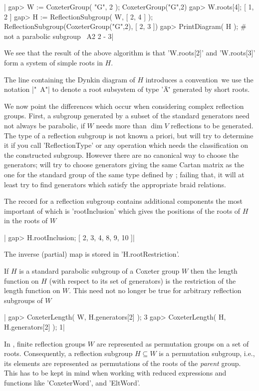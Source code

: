 |    gap> W := CoxeterGroup( "G", 2 );
    CoxeterGroup("G",2)
    gap> W.roots[4];
    [ 1, 2 ]
    gap> H := ReflectionSubgroup( W, [ 2, 4 ] );
    ReflectionSubgroup(CoxeterGroup("G",2), [ 2, 3 ])
    gap> PrintDiagram( H );         # not a parabolic subgroup
    ~A2 2 - 3|

We see that  the result of the above algorithm  is that 'W.roots[2]' and
'W.roots[3]' form a system of simple roots in $H$.

The line containing the Dynkin  diagram of $H$ introduces a convention\:\
we use the  notation |"~A"| to denote a  root  subsystem of type  '\"A\"'
generated by short roots.

We  now  point the  differences  which  occur when  considering  complex
reflection  groups. First,  a  subgroup  generated by  a  subset of  the
standard generators need not always be parabolic, if $W$ needs more than
$\dim V$ reflections to be generated.  The type of a reflection subgroup
is not  known a priori,  but {\CHEVIE} will try  to determine it  if you
call 'ReflectionType' or any operation which needs the classification on
the constructed subgroup.  However there are no canonical  way to choose
the generators; {\CHEVIE} will try  to choose generators giving the same
Cartan matrix as the one for the standard group of the same type defined
by \CHEVIE;  failing that,  it will  at least  try to  find generators
which satisfy the appropriate braid relations.

The record for a reflection  subgroup contains additional components the
most important of which is  'rootInclusion' which gives the positions of
the roots of $H$ in the roots of $W$\:

|    gap> H.rootInclusion;
    [ 2, 3, 4, 8, 9, 10 ]|

The inverse (partial) map is stored  in 'H.rootRestriction'.

If $H$ is a standard parabolic subgroup  of a Coxeter group $W$ then the
length function  on $H$ (with respect  to its set of  generators) is the
restriction of  the length function on  $W$. This need not  no longer be
true for arbitrary reflection subgroups of $W$\:

|    gap> CoxeterLength( W, H.generators[2] );
    3
    gap> CoxeterLength( H, H.generators[2] );
    1|

In \GAP,  finite reflection  groups $W$  are represented  as permutation
groups  on  a set  of  roots.  Consequently,  a reflection  subgroup  $H
\subseteq  W$  is  a  permutation   subgroup,  i.e.,  its  elements  are
represented as permutations of the roots of the {\it parent} group. This
has  to be  kept  in  mind when  working  with  reduced expressions  and
functions like 'CoxeterWord', and 'EltWord'.


